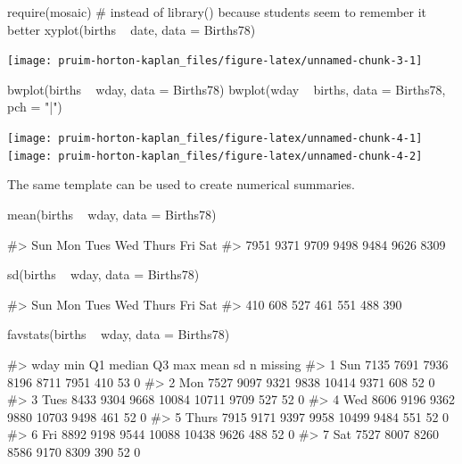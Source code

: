 \begin{Schunk}
\begin{Sinput}
require(mosaic)     # instead of library() because students seem to remember it better
xyplot(births ~ date, data = Births78)
\end{Sinput}


\begin{center}\texttt{[image: pruim-horton-kaplan\_files/figure-latex/unnamed-chunk-3-1]} \end{center}

\end{Schunk}\begin{Schunk}
\begin{Sinput}
bwplot(births ~ wday, data = Births78) 
bwplot(wday ~ births, data = Births78, pch = "|")
\end{Sinput}


\begin{center}\texttt{[image: pruim-horton-kaplan\_files/figure-latex/unnamed-chunk-4-1]} \texttt{[image: pruim-horton-kaplan\_files/figure-latex/unnamed-chunk-4-2]} \end{center}

\end{Schunk}

\noindent
The same template can be used to create numerical summaries.

\begin{Schunk}
\begin{Sinput}
mean(births ~ wday, data = Births78)
\end{Sinput}
\begin{Soutput}
#>   Sun   Mon  Tues   Wed Thurs   Fri   Sat 
#>  7951  9371  9709  9498  9484  9626  8309
\end{Soutput}
\begin{Sinput}
sd(births ~ wday, data = Births78)
\end{Sinput}
\begin{Soutput}
#>   Sun   Mon  Tues   Wed Thurs   Fri   Sat 
#>   410   608   527   461   551   488   390
\end{Soutput}
\begin{Sinput}
favstats(births ~ wday, data = Births78)
\end{Sinput}
\begin{Soutput}
#>    wday  min   Q1 median    Q3   max mean  sd  n missing
#> 1   Sun 7135 7691   7936  8196  8711 7951 410 53       0
#> 2   Mon 7527 9097   9321  9838 10414 9371 608 52       0
#> 3  Tues 8433 9304   9668 10084 10711 9709 527 52       0
#> 4   Wed 8606 9196   9362  9880 10703 9498 461 52       0
#> 5 Thurs 7915 9171   9397  9958 10499 9484 551 52       0
#> 6   Fri 8892 9198   9544 10088 10438 9626 488 52       0
#> 7   Sat 7527 8007   8260  8586  9170 8309 390 52       0
\end{Soutput}
\end{Schunk}

